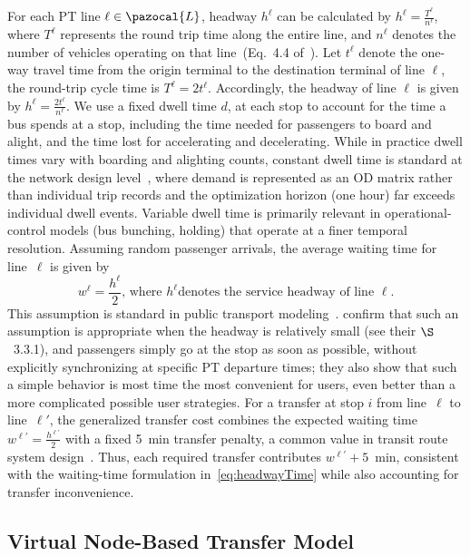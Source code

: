 \documentclass[a4paper,fleqn]{cas-sc}
\begin{document}
For each PT line $\ell \in \pazocal{L}$, headway $h^\ell$ can be calculated by $h^\ell = \frac{T^\ell}{n^\ell}$, where $T^\ell$ represents the round trip time along the entire line, and $n^\ell$ denotes the number of vehicles operating on that line~(Eq.~4.4 of~\citep{vuchic1981timed}).  
Let $t^\ell$ denote the one-way travel time from the origin terminal to the destination terminal of line $\ell$, the round-trip cycle time is $T^\ell = 2t^\ell$.
Accordingly, the headway of line $\ell$ is given by
$h^\ell = \frac{2t^\ell}{n^\ell}$.
%
We use a fixed dwell time $d$, at each stop to account for the time a bus spends at a stop, including the time needed for passengers to board and alight, and the time lost for accelerating and decelerating.
While in practice dwell times vary with boarding and alighting counts, constant dwell time is standard at the network design level~\citep{HUYNH2022392, chen2022TRSC, schobel2022cheapest}, where demand is represented as an OD matrix rather than individual trip records and the optimization horizon (one hour) far exceeds individual dwell events. Variable dwell time is primarily relevant in operational-control models (bus bunching, holding) that operate at a finer temporal resolution.
%
Assuming random passenger arrivals, the average waiting time for line~$\ell$ is given by
\begin{equation}
    w^\ell = \frac{h^\ell}{2}\text{, where }h^\ell \text{denotes the service headway of line~}\ell.
    \label{eq:headwayTime}
\end{equation}
This assumption is standard in public transport modeling~\citep{parbo2018reducing, zhang2018service}. 
\cite{liu2020does} confirm that such an assumption is appropriate when the headway is relatively small (see their $\S$~3.3.1), and passengers simply go at the stop as soon as possible, without explicitly synchronizing at specific PT departure times; they also show that such a simple behavior is most time the most convenient for users, even better than a more complicated possible user strategies.
%
For a transfer at stop $i$ from line~$\ell$ to line~$\ell'$, the generalized transfer cost combines the expected waiting time
$w^{\ell'} = \frac{h^{\ell'}}{2}$
with a fixed 5~min transfer penalty, a common value in transit route system design~\citep{baaj1991ai}. Thus, each required transfer contributes $w^{\ell'}+5$~min, consistent with the waiting-time formulation in~\eqref{eq:headwayTime} while also accounting for transfer inconvenience.

\subsection{Virtual Node-Based Transfer Model}\label{sec:virtual_nodes}
\end{document}

